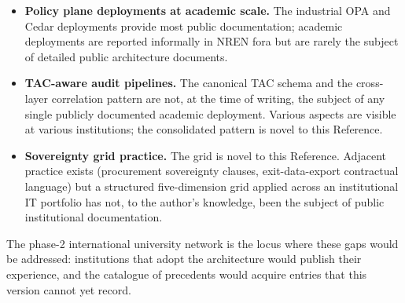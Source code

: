 \begin{itemize}[leftmargin=1.5em,nosep]
  \item \textbf{Policy plane deployments at academic scale.} The
    industrial OPA and Cedar deployments provide most public
    documentation; academic deployments are reported informally
    in NREN fora but are rarely the subject of detailed public
    architecture documents.
  \item \textbf{TAC-aware audit pipelines.} The canonical TAC
    schema and the cross-layer correlation pattern are not, at
    the time of writing, the subject of any single publicly
    documented academic deployment. Various aspects are visible
    at various institutions; the consolidated pattern is novel
    to this Reference.
  \item \textbf{Sovereignty grid practice.} The grid is novel to
    this Reference. Adjacent practice exists (procurement
    sovereignty clauses, exit-data-export contractual language)
    but a structured five-dimension grid applied across an
    institutional IT portfolio has not, to the author's
    knowledge, been the subject of public institutional
    documentation.
\end{itemize}

\noindent The phase-2 international university network is the
locus where these gaps would be addressed: institutions that
adopt the architecture would publish their experience, and the
catalogue of precedents would acquire entries that this version
cannot yet record.

